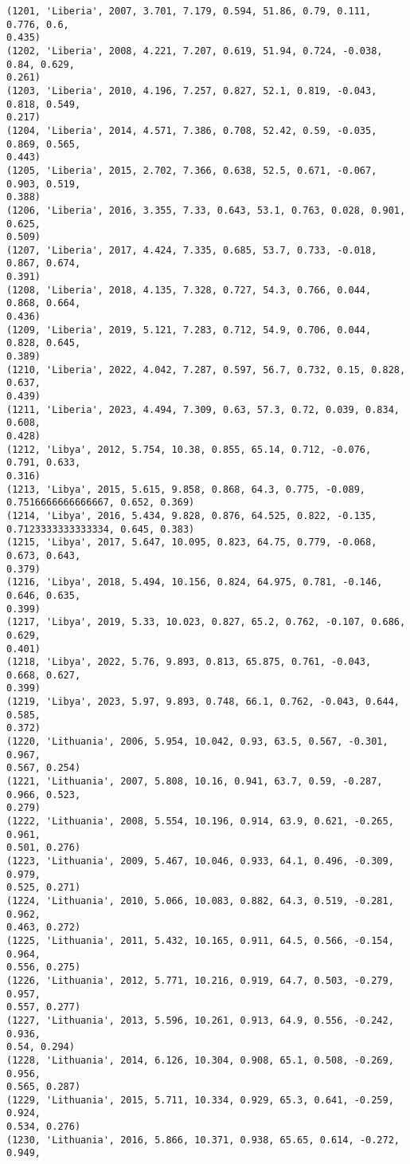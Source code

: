 \documentclass[11pt]{article}
\begin{document}
\begin{Verbatim}[commandchars=\\\{\}]
(1201, 'Liberia', 2007, 3.701, 7.179, 0.594, 51.86, 0.79, 0.111, 0.776, 0.6,
0.435)
(1202, 'Liberia', 2008, 4.221, 7.207, 0.619, 51.94, 0.724, -0.038, 0.84, 0.629,
0.261)
(1203, 'Liberia', 2010, 4.196, 7.257, 0.827, 52.1, 0.819, -0.043, 0.818, 0.549,
0.217)
(1204, 'Liberia', 2014, 4.571, 7.386, 0.708, 52.42, 0.59, -0.035, 0.869, 0.565,
0.443)
(1205, 'Liberia', 2015, 2.702, 7.366, 0.638, 52.5, 0.671, -0.067, 0.903, 0.519,
0.388)
(1206, 'Liberia', 2016, 3.355, 7.33, 0.643, 53.1, 0.763, 0.028, 0.901, 0.625,
0.509)
(1207, 'Liberia', 2017, 4.424, 7.335, 0.685, 53.7, 0.733, -0.018, 0.867, 0.674,
0.391)
(1208, 'Liberia', 2018, 4.135, 7.328, 0.727, 54.3, 0.766, 0.044, 0.868, 0.664,
0.436)
(1209, 'Liberia', 2019, 5.121, 7.283, 0.712, 54.9, 0.706, 0.044, 0.828, 0.645,
0.389)
(1210, 'Liberia', 2022, 4.042, 7.287, 0.597, 56.7, 0.732, 0.15, 0.828, 0.637,
0.439)
(1211, 'Liberia', 2023, 4.494, 7.309, 0.63, 57.3, 0.72, 0.039, 0.834, 0.608,
0.428)
(1212, 'Libya', 2012, 5.754, 10.38, 0.855, 65.14, 0.712, -0.076, 0.791, 0.633,
0.316)
(1213, 'Libya', 2015, 5.615, 9.858, 0.868, 64.3, 0.775, -0.089,
0.7516666666666667, 0.652, 0.369)
(1214, 'Libya', 2016, 5.434, 9.828, 0.876, 64.525, 0.822, -0.135,
0.7123333333333334, 0.645, 0.383)
(1215, 'Libya', 2017, 5.647, 10.095, 0.823, 64.75, 0.779, -0.068, 0.673, 0.643,
0.379)
(1216, 'Libya', 2018, 5.494, 10.156, 0.824, 64.975, 0.781, -0.146, 0.646, 0.635,
0.399)
(1217, 'Libya', 2019, 5.33, 10.023, 0.827, 65.2, 0.762, -0.107, 0.686, 0.629,
0.401)
(1218, 'Libya', 2022, 5.76, 9.893, 0.813, 65.875, 0.761, -0.043, 0.668, 0.627,
0.399)
(1219, 'Libya', 2023, 5.97, 9.893, 0.748, 66.1, 0.762, -0.043, 0.644, 0.585,
0.372)
(1220, 'Lithuania', 2006, 5.954, 10.042, 0.93, 63.5, 0.567, -0.301, 0.967,
0.567, 0.254)
(1221, 'Lithuania', 2007, 5.808, 10.16, 0.941, 63.7, 0.59, -0.287, 0.966, 0.523,
0.279)
(1222, 'Lithuania', 2008, 5.554, 10.196, 0.914, 63.9, 0.621, -0.265, 0.961,
0.501, 0.276)
(1223, 'Lithuania', 2009, 5.467, 10.046, 0.933, 64.1, 0.496, -0.309, 0.979,
0.525, 0.271)
(1224, 'Lithuania', 2010, 5.066, 10.083, 0.882, 64.3, 0.519, -0.281, 0.962,
0.463, 0.272)
(1225, 'Lithuania', 2011, 5.432, 10.165, 0.911, 64.5, 0.566, -0.154, 0.964,
0.556, 0.275)
(1226, 'Lithuania', 2012, 5.771, 10.216, 0.919, 64.7, 0.503, -0.279, 0.957,
0.557, 0.277)
(1227, 'Lithuania', 2013, 5.596, 10.261, 0.913, 64.9, 0.556, -0.242, 0.936,
0.54, 0.294)
(1228, 'Lithuania', 2014, 6.126, 10.304, 0.908, 65.1, 0.508, -0.269, 0.956,
0.565, 0.287)
(1229, 'Lithuania', 2015, 5.711, 10.334, 0.929, 65.3, 0.641, -0.259, 0.924,
0.534, 0.276)
(1230, 'Lithuania', 2016, 5.866, 10.371, 0.938, 65.65, 0.614, -0.272, 0.949,

\end{Verbatim}
\end{document}
